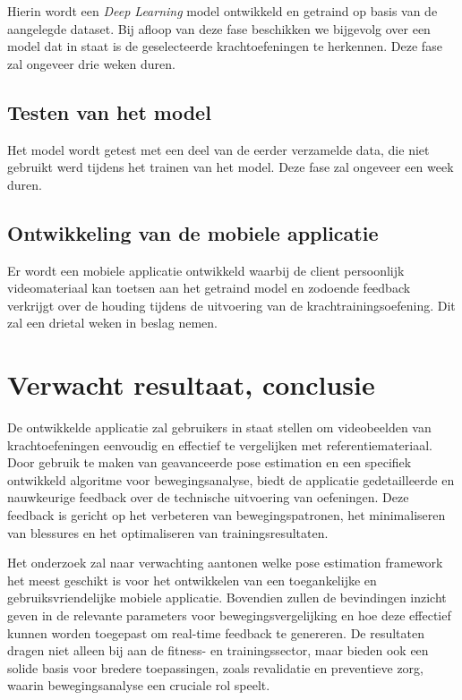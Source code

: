 Hierin wordt een \emph{Deep Learning} model ontwikkeld en getraind op basis van de aangelegde dataset. Bij afloop van deze fase beschikken we bijgevolg over een model dat in staat is de geselecteerde krachtoefeningen te herkennen. Deze fase zal ongeveer drie weken duren.

\subsection{Testen van het model}
\label{sec:testen van het model}
Het model wordt getest met een deel van de eerder verzamelde data, die niet gebruikt werd tijdens het trainen van het model. Deze fase zal ongeveer een week duren.

\subsection{Ontwikkeling van de mobiele applicatie}
\label{sec:ontwikkeling van de mobiele applicatie}
Er wordt een mobiele applicatie ontwikkeld waarbij de client persoonlijk videomateriaal kan toetsen aan het getraind model en zodoende feedback verkrijgt over de houding tijdens de uitvoering van de krachtrainingsoefening. Dit zal een drietal weken in beslag nemen.

\section{Verwacht resultaat, conclusie}%
\label{sec:verwachte_resultaten}

De ontwikkelde applicatie zal gebruikers in staat stellen om videobeelden van krachtoefeningen eenvoudig en effectief te vergelijken met referentiemateriaal. Door gebruik te maken van geavanceerde pose estimation en een specifiek ontwikkeld algoritme voor bewegingsanalyse, biedt de applicatie gedetailleerde en nauwkeurige feedback over de technische uitvoering van oefeningen. Deze feedback is gericht op het verbeteren van bewegingspatronen, het minimaliseren van blessures en het optimaliseren van trainingsresultaten.

Het onderzoek zal naar verwachting aantonen welke pose estimation framework het meest geschikt is voor het ontwikkelen van een toegankelijke en gebruiksvriendelijke mobiele applicatie. Bovendien zullen de bevindingen inzicht geven in de relevante parameters voor bewegingsvergelijking en hoe deze effectief kunnen worden toegepast om real-time feedback te genereren. De resultaten dragen niet alleen bij aan de fitness- en trainingssector, maar bieden ook een solide basis voor bredere toepassingen, zoals revalidatie en preventieve zorg, waarin bewegingsanalyse een cruciale rol speelt.

